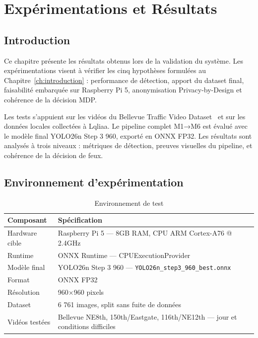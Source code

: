 \chapter{Expérimentations et Résultats}
\label{ch:resultats}

\section*{Introduction}
{}

Ce chapitre présente les résultats obtenus
lors de la validation du système. Les
expérimentations visent à vérifier les cinq
hypothèses formulées au
Chapitre~\ref{ch:introduction} : performance
de détection, apport du dataset final,
faisabilité embarquée sur Raspberry Pi 5,
anonymisation Privacy-by-Design et cohérence
de la décision MDP.

Les tests s'appuient sur les vidéos du
Bellevue Traffic Video Dataset~\cite{pradhananga2025}
et sur les données locales collectées à
Lqliaa. Le pipeline complet M1→M6 est évalué
avec le modèle final YOLO26n Step 3 960,
exporté en ONNX FP32. Les résultats sont
analysés à trois niveaux : métriques de
détection, preuves visuelles du pipeline,
et cohérence de la décision de feux.

\section{Environnement d'expérimentation}

\begin{table}[H]
\centering
\caption{Environnement de test}
\begin{tabularx}{\textwidth}{lX}
\toprule
\textbf{Composant} & \textbf{Spécification} \\
\midrule
Hardware cible &
Raspberry Pi 5 — 8GB RAM,
CPU ARM Cortex-A76 @ 2.4GHz \\
Runtime &
ONNX Runtime — CPUExecutionProvider \\
Modèle final &
YOLO26n Step 3 960 —
\texttt{YOLO26n\_step3\_960\_best.onnx} \\
Format &
ONNX FP32 \\
Résolution &
960$\times$960 pixels \\
Dataset &
6 761 images, split sans fuite de données \\
Vidéos testées &
Bellevue NE8th, 150th/Eastgate,
116th/NE12th — jour et conditions difficiles \\
\bottomrule
\end{tabularx}
\label{tab:env_test}
\end{table}

